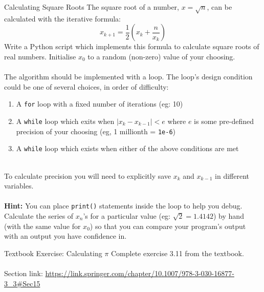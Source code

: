 \documentclass{lab}
\begin{document}
\pagebreak
\begin{task}{Calculating Square Roots}{}
The square root of a number, $x = \sqrt{n}$, can be calculated with the iterative formula:
\begin{equation}\label{eq:sqrt}
x_{k+1} = \frac{1}{2}\left(x_k + \frac{n}{x_k}\right)
\end{equation}
Write a Python script which implements this formula to calculate square roots of real numbers. Initialise $x_0$ to a random (non-zero) value of your choosing.
\\ \\
The algorithm should be implemented with a loop. The loop's design condition could be one of several choices, in order of difficulty:\\
\begin{enumerate}
\item A \texttt{for} loop with a fixed number of iterations (eg: 10)
\item A \texttt{while} loop which exits when $\left| x_k - x_{k-1} \right| < e$ where $e$ is some pre-defined precision of your choosing (eg, 1 millionth = \texttt{1e-6})
\item A \texttt{while} loop which exists when either of the above conditions are met
\end{enumerate}
~\\
To calculate precision you will need to explicitly save $x_k$ and $x_{k-1}$ in different variables.
\\~\\
\textbf{Hint:} You can place \texttt{print()} statements inside the loop to help you debug. Calculate the series of $x_n$'s for a particular value (eg: $\sqrt{2}=1.4142$) by hand (with the same value for $x_0$) so that you can compare your program's output with an output you have confidence in.
\end{task}\label{tsk:sqrt}

\begin{task}{Textbook Exercise: Calculating $\pi$}{}
Complete exercise 3.11 from the textbook.
\\~\\
Section link: \url{https://link.springer.com/chapter/10.1007/978-3-030-16877-3_3#Sec15}
\end{task}
\end{document}
